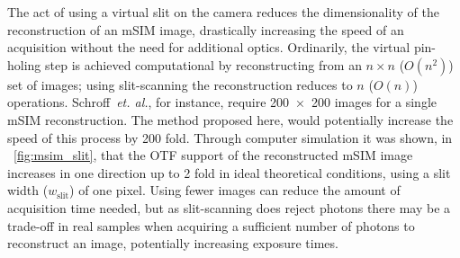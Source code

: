 The act of using a virtual slit on the camera reduces the dimensionality of the reconstruction of an \gls{mSIM} image, drastically increasing the speed of an acquisition without the need for additional optics.
Ordinarily, the virtual pin-holing step is achieved computational by reconstructing from an \(n\times n\) (\(O(n^2)\)) set of images; using \gls{slit-scanning} the reconstruction reduces to $n$ (\(O(n)\)) operations.
Schroff~\emph{et. al.}, for instance, require \SI{200 x 200}{} images for a single \gls{mSIM} reconstruction.
The method proposed here, would potentially increase the speed of this process by \SI{200}{} fold.
Through computer simulation it was shown, in \figurename~\ref{fig:msim_slit}, that the \gls{OTF} support of the reconstructed \gls{mSIM} image increases in one direction up to \SI{2}{} fold in ideal theoretical conditions, using a slit width (\(w_{\text{slit}}\)) of one pixel.
Using fewer images can reduce the amount of acquisition time needed, but as \gls{slit-scanning} does reject photons there may be a trade-off in real samples when acquiring a sufficient number of photons to reconstruct an image, potentially increasing exposure times.
